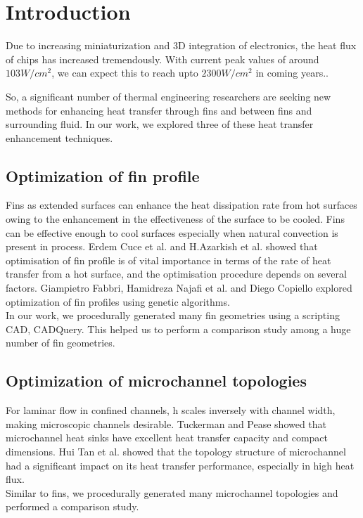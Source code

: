 \documentclass[../main.tex]{subfiles}
\begin{document}
\section{Introduction}

Due to increasing miniaturization and 3D integration of electronics,
the heat flux of chips has increased tremendously.
With current peak values of around $103 W/cm^2$,
we can expect this to reach upto $2300 W/cm^2$ in coming years..

So, a significant number of thermal engineering researchers are seeking new methods for enhancing heat transfer through fins and between fins and surrounding fluid.
In our work, we explored three of these heat transfer enhancement techniques.

\subsection{Optimization of fin profile}
Fins as extended surfaces can enhance the heat dissipation rate from hot surfaces owing to the enhancement in
the effectiveness of the surface to be cooled. Fins can be effective enough to cool surfaces especially when natural convection is present in process.
Erdem Cuce et al.  and H.Azarkish et al.  showed that optimisation of fin profile is of vital importance in terms of the rate of heat transfer from a hot surface,
and the optimisation procedure depends on several factors.
Giampietro Fabbri,  Hamidreza Najafi et al.  and Diego Copiello  explored optimization of fin profiles using genetic algorithms.
\\
In our work, we procedurally generated many fin geometries using a scripting CAD, CADQuery.
This helped us to perform a comparison study among a huge number of fin geometries.

\subsection{Optimization of microchannel topologies}
For laminar flow in confined channels, h scales inversely with channel width, making microscopic
channels desirable. Tuckerman and Pease  showed that microchannel heat sinks have excellent heat transfer capacity and compact dimensions.
Hui Tan et al.  showed that the topology structure of microchannel had a significant impact on its heat transfer
performance, especially in high heat flux.
\\
Similar to fins, we procedurally generated many microchannel topologies and performed a comparison study.
\end{document}
